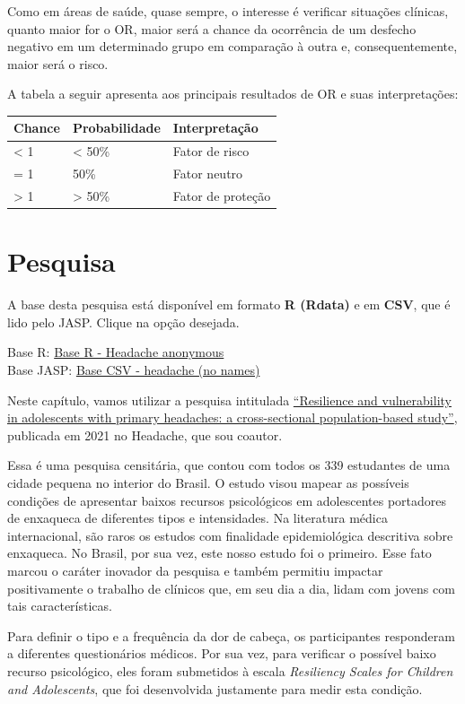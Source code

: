 \documentclass[
]{book}
\begin{document}
Como em áreas de saúde, quase sempre, o interesse é verificar situações clínicas, quanto maior for o OR, maior será a chance da ocorrência de um desfecho negativo em um determinado grupo em comparação à outra e, consequentemente, maior será o risco.

A tabela a seguir apresenta aos principais resultados de OR e suas interpretações:

\begin{longtable}[]{@{}lll@{}}
\toprule
Chance & Probabilidade & Interpretação\tabularnewline
\midrule
\endhead
\textless{} 1 & \textless{} 50\% & Fator de risco\tabularnewline
= 1 & 50\% & Fator neutro\tabularnewline
\textgreater{} 1 & \textgreater{} 50\% & Fator de proteção\tabularnewline
\bottomrule
\end{longtable}

\hypertarget{pesquisa-11}{%
\section{Pesquisa}\label{pesquisa-11}}

A base desta pesquisa está disponível em formato \textbf{R (Rdata)} e em \textbf{CSV}, que é lido pelo JASP. Clique na opção desejada.

Base R: \href{https://github.com/anovabr/mqt/raw/master/bases/Base\%20R\%20-\%20Headache\%20anonymous.RData}{Base R - Headache anonymous}\\
Base JASP: \href{https://github.com/anovabr/mqt/raw/master/bases/bases_csv_jasp.zip}{Base CSV - headache (no names)}

Neste capítulo, vamos utilizar a pesquisa intitulada \href{www.google.com}{``Resilience and vulnerability in adolescents with primary headaches: a cross-sectional population-based study''}, publicada em 2021 no Headache, que sou coautor.

Essa é uma pesquisa censitária, que contou com todos os 339 estudantes de uma cidade pequena no interior do Brasil. O estudo visou mapear as possíveis condições de apresentar baixos recursos psicológicos em adolescentes portadores de enxaqueca de diferentes tipos e intensidades. Na literatura médica internacional, são raros os estudos com finalidade epidemiológica descritiva sobre enxaqueca. No Brasil, por sua vez, este nosso estudo foi o primeiro. Esse fato marcou o caráter inovador da pesquisa e também permitiu impactar positivamente o trabalho de clínicos que, em seu dia a dia, lidam com jovens com tais características.

Para definir o tipo e a frequência da dor de cabeça, os participantes responderam a diferentes questionários médicos. Por sua vez, para verificar o possível baixo recurso psicológico, eles foram submetidos à escala \emph{Resiliency Scales for Children and Adolescents}, que foi desenvolvida justamente para medir esta condição.
\end{document}
